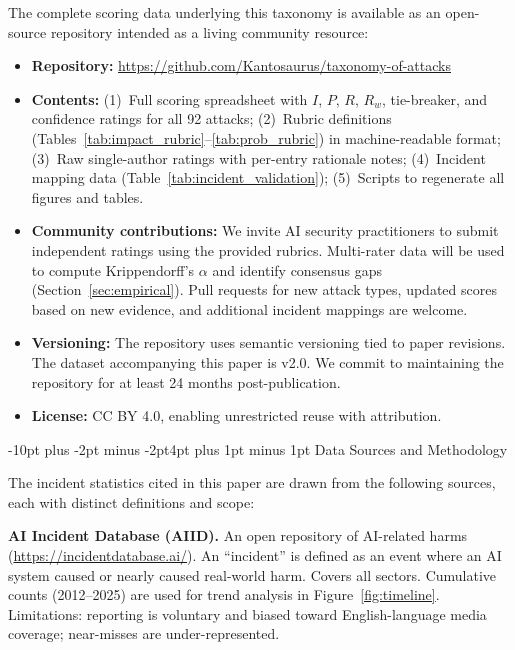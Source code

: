 \documentclass[conference]{IEEEtran}
\makeatletter
\renewcommand{\section}{\@startsection{section}{1}{\z@}%
  {-10pt plus -2pt minus -2pt}{4pt plus 1pt minus 1pt}%
  {\normalfont\large\bfseries\sffamily\color{accentdark}}}
\makeatother
\begin{document}
The complete scoring data underlying this taxonomy is available as an open-source repository intended as a living community resource:

\begin{itemize}[leftmargin=*, nosep]
\item \textbf{Repository:} \url{https://github.com/Kantosaurus/taxonomy-of-attacks}
\item \textbf{Contents:} (1)~Full scoring spreadsheet with $I$, $P$, $R$, $R_w$, tie-breaker, and confidence ratings for all 92 attacks; (2)~Rubric definitions (Tables~\ref{tab:impact_rubric}--\ref{tab:prob_rubric}) in machine-readable format; (3)~Raw single-author ratings with per-entry rationale notes; (4)~Incident mapping data (Table~\ref{tab:incident_validation}); (5)~Scripts to regenerate all figures and tables.
\item \textbf{Community contributions:} We invite AI security practitioners to submit independent ratings using the provided rubrics. Multi-rater data will be used to compute Krippendorff's $\alpha$ and identify consensus gaps (Section~\ref{sec:empirical}). Pull requests for new attack types, updated scores based on new evidence, and additional incident mappings are welcome.
\item \textbf{Versioning:} The repository uses semantic versioning tied to paper revisions. The dataset accompanying this paper is v2.0. We commit to maintaining the repository for at least 24 months post-publication.
\item \textbf{License:} CC BY 4.0, enabling unrestricted reuse with attribution.
\end{itemize}

\section{Data Sources and Methodology}\label{app:data}

The incident statistics cited in this paper are drawn from the following sources, each with distinct definitions and scope:

\textbf{AI Incident Database (AIID).} An open repository of AI-related harms (\url{https://incidentdatabase.ai/}). An ``incident'' is defined as an event where an AI system caused or nearly caused real-world harm. Covers all sectors. Cumulative counts (2012--2025) are used for trend analysis in Figure~\ref{fig:timeline}. Limitations: reporting is voluntary and biased toward English-language media coverage; near-misses are under-represented.
\end{document}
